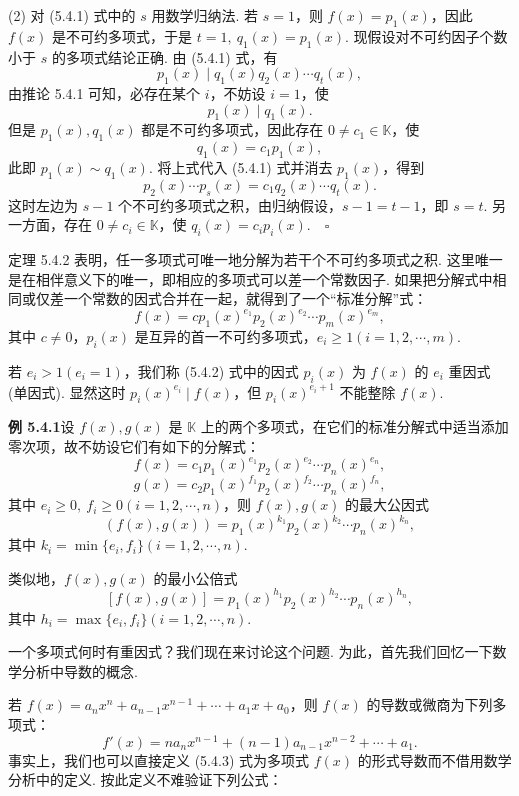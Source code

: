 \documentclass[UTF8, 12pt, fontset=fandol, oneside]{ctexart}
\begin{document}
(2) 对 (5.4.1) 式中的 $s$ 用数学归纳法. 若 $s=1$，则 $f(x)=p_1(x)$，因此 $f(x)$ 是不可约多项式，于是 $t=1,\ q_1(x)=p_1(x)$. 现假设对不可约因子个数小于 $s$ 的多项式结论正确. 由 (5.4.1) 式，有
\[
p_1(x)\mid q_1(x)q_2(x)\cdots q_t(x),
\]
由推论 5.4.1 可知，必存在某个 $i$，不妨设 $i=1$，使
\[
p_1(x)\mid q_1(x).
\]
但是 $p_1(x),q_1(x)$ 都是不可约多项式，因此存在 $0\neq c_1\in\mathbb{K}$，使
\[
q_1(x)=c_1p_1(x),
\]
此即 $p_1(x)\sim q_1(x)$. 将上式代入 (5.4.1) 式并消去 $p_1(x)$，得到
\[
p_2(x)\cdots p_s(x)=c_1q_2(x)\cdots q_t(x).
\]
这时左边为 $s-1$ 个不可约多项式之积，由归纳假设，$s-1=t-1$，即 $s=t$. 另一方面，存在 $0\neq c_i\in\mathbb{K}$，使 $q_i(x)=c_ip_i(x).\quad \square$

定理 5.4.2 表明，任一多项式可唯一地分解为若干个不可约多项式之积. 这里唯一是在相伴意义下的唯一，即相应的多项式可以差一个常数因子. 如果把分解式中相同或仅差一个常数的因式合并在一起，就得到了一个“标准分解”式：
\begin{equation}
f(x)=cp_1(x)^{e_1}p_2(x)^{e_2}\cdots p_m(x)^{e_m},
\tag{5.4.2}
\end{equation}
其中 $c\neq 0$，$p_i(x)$ 是互异的首一不可约多项式，$e_i\geq 1(i=1,2,\cdots,m)$.

若 $e_i>1(e_i=1)$，我们称 (5.4.2) 式中的因式 $p_i(x)$ 为 $f(x)$ 的 $e_i$ 重因式 (单因式). 显然这时 $p_i(x)^{e_i}\mid f(x)$，但 $p_i(x)^{e_i+1}$ 不能整除 $f(x)$.

\noindent\textbf{例 5.4.1}\quad 设 $f(x),g(x)$ 是 $\mathbb{K}$ 上的两个多项式，在它们的标准分解式中适当添加零次项，故不妨设它们有如下的分解式：
\[
f(x)=c_1p_1(x)^{e_1}p_2(x)^{e_2}\cdots p_n(x)^{e_n},
\]
\[
g(x)=c_2p_1(x)^{f_1}p_2(x)^{f_2}\cdots p_n(x)^{f_n},
\]
其中 $e_i\geq 0,\ f_i\geq 0(i=1,2,\cdots,n)$，则 $f(x),g(x)$ 的最大公因式
\[
(f(x),g(x))=p_1(x)^{k_1}p_2(x)^{k_2}\cdots p_n(x)^{k_n},
\]
其中 $k_i=\min\{e_i,f_i\}(i=1,2,\cdots,n)$.

类似地，$f(x),g(x)$ 的最小公倍式
\[
[f(x),g(x)]=p_1(x)^{h_1}p_2(x)^{h_2}\cdots p_n(x)^{h_n},
\]
其中 $h_i=\max\{e_i,f_i\}(i=1,2,\cdots,n)$.

一个多项式何时有重因式？我们现在来讨论这个问题. 为此，首先我们回忆一下数学分析中导数的概念.

若 $f(x)=a_nx^n+a_{n-1}x^{n-1}+\cdots+a_1x+a_0$，则 $f(x)$ 的导数或微商为下列多项式：
\begin{equation}
f'(x)=na_nx^{n-1}+(n-1)a_{n-1}x^{n-2}+\cdots+a_1.
\tag{5.4.3}
\end{equation}
事实上，我们也可以直接定义 (5.4.3) 式为多项式 $f(x)$ 的形式导数而不借用数学分析中的定义. 按此定义不难验证下列公式：
\end{document}
